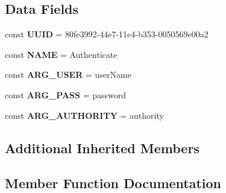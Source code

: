 \subsection*{Data Fields}
\begin{DoxyCompactItemize}
\item 
\hypertarget{class_able_polecat___command___access_control___authenticate_a74b892c8c0b86bf9d04c5819898c51e7}{}const {\bfseries U\+U\+I\+D} = \textquotesingle{}80fe3992-\/44e7-\/11e4-\/b353-\/0050569e00a2\textquotesingle{}\label{class_able_polecat___command___access_control___authenticate_a74b892c8c0b86bf9d04c5819898c51e7}

\item 
\hypertarget{class_able_polecat___command___access_control___authenticate_a244352f035b82b20b0efa506167fd862}{}const {\bfseries N\+A\+M\+E} = \textquotesingle{}Authenticate\textquotesingle{}\label{class_able_polecat___command___access_control___authenticate_a244352f035b82b20b0efa506167fd862}

\item 
\hypertarget{class_able_polecat___command___access_control___authenticate_a68709a24f07c4499d0b3c69fdf6ca49a}{}const {\bfseries A\+R\+G\+\_\+\+U\+S\+E\+R} = \textquotesingle{}user\+Name\textquotesingle{}\label{class_able_polecat___command___access_control___authenticate_a68709a24f07c4499d0b3c69fdf6ca49a}

\item 
\hypertarget{class_able_polecat___command___access_control___authenticate_aac3ce5e700654db39c288cc77761c0fb}{}const {\bfseries A\+R\+G\+\_\+\+P\+A\+S\+S} = \textquotesingle{}password\textquotesingle{}\label{class_able_polecat___command___access_control___authenticate_aac3ce5e700654db39c288cc77761c0fb}

\item 
\hypertarget{class_able_polecat___command___access_control___authenticate_ab657909effc5a91ae07d05651251a4d0}{}const {\bfseries A\+R\+G\+\_\+\+A\+U\+T\+H\+O\+R\+I\+T\+Y} = \textquotesingle{}authority\textquotesingle{}\label{class_able_polecat___command___access_control___authenticate_ab657909effc5a91ae07d05651251a4d0}

\end{DoxyCompactItemize}
\subsection*{Additional Inherited Members}


\subsection{Member Function Documentation}
\hypertarget{class_able_polecat___command___access_control___authenticate_a1f73860dd14340c5bad9094f0b5b97c2}{}
